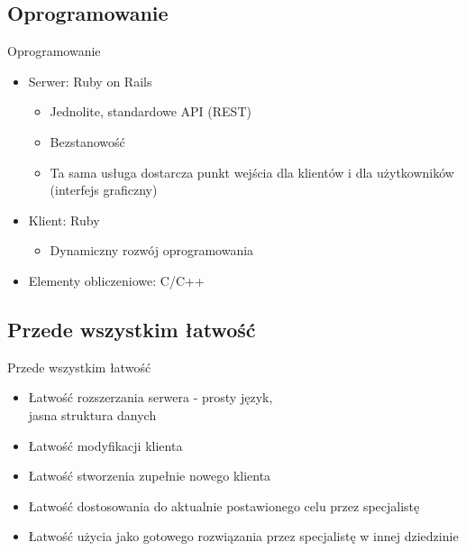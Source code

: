 \documentclass[12pt]{beamer}
\begin{document}
\subsection{Oprogramowanie}
\begin{frame}{Oprogramowanie}
\begin{itemize}
	\item Serwer: Ruby on Rails
	\begin{itemize}
		\item Jednolite, standardowe API (REST)
		\item Bezstanowość
		\item Ta sama usługa dostarcza punkt wejścia dla klientów i dla użytkowników (interfejs graficzny)
	\end{itemize}
	\item Klient: Ruby
	\begin{itemize}
		\item Dynamiczny rozwój oprogramowania
	\end{itemize}
	\item Elementy obliczeniowe: C/C++
\end{itemize}
\end{frame}

\subsection{Przede wszystkim łatwość}
\begin{frame}{Przede wszystkim łatwość}
\begin{itemize}
	\item Łatwość rozszerzania serwera - prosty język,\\ jasna struktura danych
	\item Łatwość modyfikacji klienta
	\item Łatwość stworzenia zupełnie nowego klienta
	\item Łatwość dostosowania do aktualnie postawionego celu przez specjalistę
	\item Łatwość użycia jako gotowego rozwiązania przez specjalistę w innej dziedzinie
\end{itemize}
\end{frame}
\end{document}
